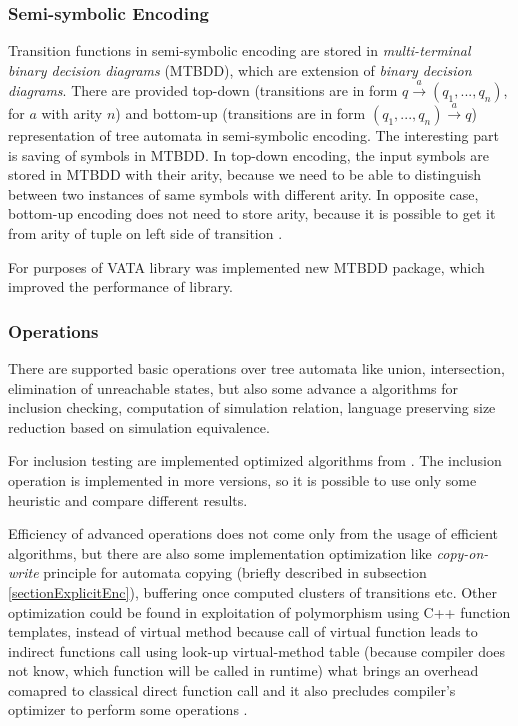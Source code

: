 \subsubsection{Semi-symbolic Encoding}
Transition functions in semi-symbolic encoding are stored in \emph{multi-terminal binary decision diagrams} (MTBDD), which are extension of \emph{binary decision 
diagrams}. There are provided top-down (transitions are in form $q \xrightarrow{a} (q_1,...,q_n)$, for $a$ with arity $n$) 
and bottom-up (transitions are in form $(q_1,...,q_n)\xrightarrow{a}q$) representation of tree automata in semi-symbolic encoding. 
The interesting part is saving of symbols in MTBDD. In top-down encoding, the input
symbols are stored in MTBDD with their arity, because we need to be able to distinguish between two instances of same symbols with different arity.
In opposite case, bottom-up encoding does not need to store arity, because it is possible to get it from arity of tuple on left side of transition \cite{libvata}.

For purposes of VATA library was implemented new MTBDD package, which improved the performance of library.


\subsubsection{Operations}
There are supported basic operations over tree automata 
like union, intersection, elimination of unreachable states, but also some advance a algorithms for inclusion checking, 
computation of simulation relation, language preserving size reduction based on simulation equivalence. 

For inclusion testing are implemented optimized algorithms from \cite{cav06,tacas10}. The inclusion operation is implemented in more versions, so it is possible
to use only some heuristic and compare different results.

Efficiency of advanced operations does not come only from the usage of efficient algorithms, 
but there are also some implementation optimization like \emph{copy-on-write}
principle for automata copying (briefly described in subsection \ref{sectionExplicitEnc}), buffering once computed clusters of transitions etc. 
Other optimization could be found in exploitation of polymorphism using C++ function templates, instead of
virtual method because call of virtual function leads to indirect functions call using look-up virtual-method table (because compiler does not know, which 
function will be called in runtime) what brings an overhead comapred to classical direct
function call and it also precludes compiler's optimizer to perform some operations \cite{libvata}. 

